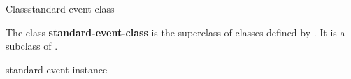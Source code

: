 \documentclass[10pt,twoside,english,pdftex]{article}
\begin{document}

\begin{functiondoc}{Class}{standard-event-class}{}
%

\fnsyntax

\fnpackage {}

\fnmodule {}

\fndescription 
{}%
The class \textbf{standard-event-class} is the superclass of classes defined
by \textbf{}.  It is a subclass of
.

\begin{alsos}{standard-event-instance}
\end{alsos}

\end{functiondoc}

\end{document}
